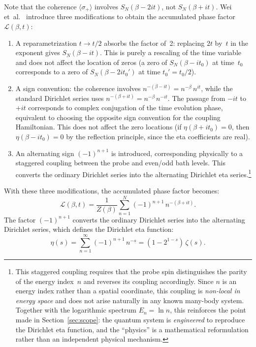Note that the coherence $\langle\sigma_+\rangle$ involves $S_N(\beta - 2it)$, not
$S_N(\beta + it)$. Wei et~al.~\cite{wei2025} introduce three modifications to obtain
the accumulated phase factor $\mathcal{L}(\beta,t)$:
\begin{enumerate}
  \item[(a)] A reparametrization $t \to t/2$ absorbs the factor of~2: replacing $2t$
    by~$t$ in the exponent gives $S_N(\beta - it)$. This is purely a rescaling of the
    time variable and does not affect the location of zeros (a zero of $S_N(\beta - it_0)$
    at time~$t_0$ corresponds to a zero of $S_N(\beta - 2it_0')$ at time $t_0' = t_0/2$).
  \item[(b)] A sign convention: the coherence involves $n^{-(\beta - it)} =
    n^{-\beta}\,n^{it}$, while the standard Dirichlet series uses
    $n^{-(\beta + it)} = n^{-\beta}\,n^{-it}$. The passage from $-it$ to $+it$
    corresponds to complex conjugation of the time evolution phase, equivalent to
    choosing the opposite sign convention for the coupling Hamiltonian. This does not
    affect the zero locations (if $\eta(\beta + it_0) = 0$, then $\eta(\beta - it_0) = 0$
    by the reflection principle, since the eta coefficients are real).
  \item[(c)] An alternating sign $(-1)^{n+1}$ is introduced, corresponding physically to
    a staggered coupling between the probe and even/odd bath levels. This converts the
    ordinary Dirichlet series into the alternating Dirichlet eta series.\footnote{This
    staggered coupling requires that the probe spin distinguishes the parity of the
    energy index~$n$ and reverses its coupling accordingly. Since $n$ is an energy index
    rather than a spatial coordinate, this coupling is \emph{non-local in energy space}
    and does not arise naturally in any known many-body system. Together with the
    logarithmic spectrum $E_n = \ln n$, this reinforces the point made in
    Section~\ref{sec:scope}: the quantum system is \emph{engineered} to reproduce the
    Dirichlet eta function, and the ``physics'' is a mathematical reformulation rather
    than an independent physical mechanism.}
\end{enumerate}
With these three modifications, the accumulated phase factor becomes:
\begin{equation}\label{eq:L-def}
  \mathcal{L}(\beta,t) = \frac{1}{Z(\beta)}
  \sum_{n=1}^{N} (-1)^{n+1}\,n^{-(\beta+it)}.
\end{equation}
The factor $(-1)^{n+1}$ converts the ordinary Dirichlet series into the alternating
Dirichlet series, which defines the Dirichlet eta function:
\begin{equation}\label{eq:eta-def}
  \eta(s) = \sum_{n=1}^{\infty} (-1)^{n+1}\,n^{-s}
  = (1 - 2^{1-s})\,\zeta(s).
\end{equation}

